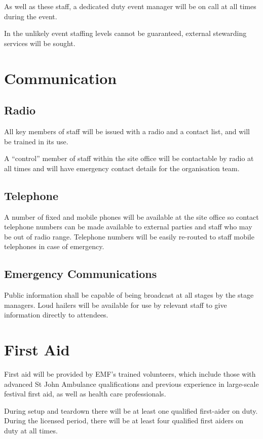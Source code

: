 As well as these staff, a dedicated duty event manager will be on call at all times during the event.

In the unlikely event staffing levels cannot be guaranteed, external stewarding services will be sought.

\section{Communication}

\subsection{Radio}
All key members of staff will be issued with a radio and a contact list, and will be trained in its use.

A ``control'' member of staff within the site office will be contactable by radio at all times and will
have emergency contact details for the organisation team.

\subsection{Telephone}
A number of fixed and mobile phones will be available at the site office so contact telephone numbers
can be made available to external parties and staff who may be out of radio range. Telephone numbers
will be easily re-routed to staff mobile telephones in case of emergency.

\subsection{Emergency Communications}
Public information shall be capable of being broadcast at all stages by the stage managers. Loud hailers will
be available for use by relevant staff to give information directly to attendees.

\section{First Aid}

First aid will be provided by EMF's trained volunteers, which include those with advanced St John Ambulance
qualifications and previous experience in large-scale festival first aid, as well as health care professionals.

During setup and teardown there will be at least one qualified first-aider on duty. During the licensed period,
there will be at least four qualified first aiders on duty at all times.

